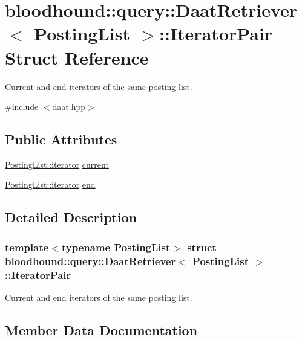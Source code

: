 \hypertarget{structbloodhound_1_1query_1_1DaatRetriever_1_1IteratorPair}{}\section{bloodhound\+:\+:query\+:\+:Daat\+Retriever$<$ Posting\+List $>$\+:\+:Iterator\+Pair Struct Reference}
\label{structbloodhound_1_1query_1_1DaatRetriever_1_1IteratorPair}


Current and end iterators of the same posting list.  




{\ttfamily \#include $<$daat.\+hpp$>$}

\subsection*{Public Attributes}
\begin{DoxyCompactItemize}
\item 
\hyperlink{structbloodhound_1_1PostingList_1_1iterator}{Posting\+List\+::iterator} \hyperlink{structbloodhound_1_1query_1_1DaatRetriever_1_1IteratorPair_a39776930389d36b2b0da49c3b5685ec4}{current}
\item 
\hyperlink{structbloodhound_1_1PostingList_1_1iterator}{Posting\+List\+::iterator} \hyperlink{structbloodhound_1_1query_1_1DaatRetriever_1_1IteratorPair_af2205effb4b97e6351c3d32c034342c2}{end}
\end{DoxyCompactItemize}


\subsection{Detailed Description}
\subsubsection*{template$<$typename Posting\+List$>$\newline
struct bloodhound\+::query\+::\+Daat\+Retriever$<$ Posting\+List $>$\+::\+Iterator\+Pair}

Current and end iterators of the same posting list. 

\subsection{Member Data Documentation}
\mbox{\label{structbloodhound_1_1query_1_1DaatRetriever_1_1IteratorPair_a39776930389d36b2b0da49c3b5685ec4}} 
